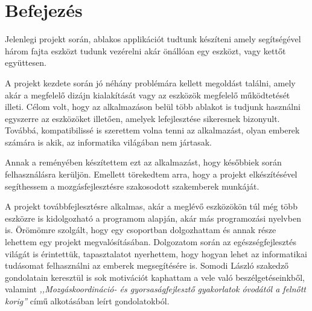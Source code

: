 \documentclass[tocnopagenum]{thesis-ekf}
\theoremstyle{definition}
\theoremstyle{remark}
\begin{document}

	

	\chapter*{Befejezés}
	Jelenlegi projekt során, ablakos applikációt tudtunk készíteni amely segítségével három fajta eszközt tudunk vezérelni akár önállóan egy eszközt, vagy kettőt együttesen.  %
	\par
	A projekt kezdete során jó néhány problémára kellett megoldást találni, amely akár a megfelelő dizájn kialakítását vagy az eszközök megfelelő működtetését illeti. Célom volt, hogy az alkalmazáson belül több ablakot is tudjunk használni egyszerre az eszközöket illetően, amelyek lefejlesztése sikeresnek bizonyult. Továbbá, kompatibilissé is szerettem volna tenni az alkalmazást, olyan emberek számára is akik, az informatika világában nem jártasak. 
	\par
	Annak a reményében készítettem ezt az alkalmazást, hogy későbbiek során felhasználásra kerüljön. Emellett törekedtem arra, hogy a projekt elkészítésével segíthessem a mozgásfejlesztésre szakosodott szakemberek munkáját.
	\par
	A projekt továbbfejlesztésre alkalmas, akár a meglévő eszközökön túl még több eszközre is kidolgozható a programom alapján, akár más programozási nyelvben is.
	Örömömre szolgált, hogy egy csoportban dolgozhattam és annak része lehettem egy projekt megvalósításában. Dolgozatom során az egészségfejlesztés világát is érintettük, tapasztalatot nyerhettem, hogy hogyan lehet az informatikai tudásomat felhasználni az emberek megsegítésére is. Somodi László szakedző gondolatain keresztül is sok motivációt kaphattam a vele való beszélgetéseinkből, valamint \textit{,,Mozgáskoordináció- és gyorsaságfejlesztő gyakorlatok óvodától a felnőtt korig''} című alkotásában leírt gondolatokból.
	
\end{document}
